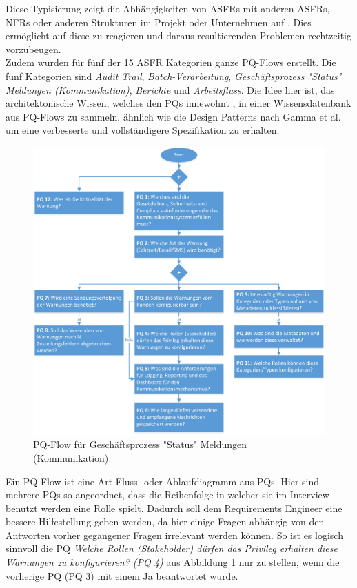 Diese Typisierung zeigt die Abh\"angigkeiten von ASFRs mit anderen ASFRs, NFRs oder anderen Strukturen im Projekt oder Unternehmen auf \cite{Ros02}. Dies erm\"oglicht auf diese zu reagieren und daraus resultierenden Problemen rechtzeitig vorzubeugen. \\

Zudem wurden f\"ur f\"unf der 15 ASFR Kategorien ganze PQ-Flows erstellt. Die f\"unf Kategorien sind \textit{Audit Trail}, \textit{Batch-Verarbeitung}, \textit{Gesch\"aftsprozess "Status" Meldungen (Kommunikation)}, \textit{Berichte} und \textit{Arbeitsfluss}. Die Idee hier ist, das architektonische Wissen, welches den PQs innewohnt \cite{Ros02}, in einer Wissensdatenbank aus PQ-Flows zu sammeln, \"ahnlich wie die Design Patterns nach Gamma et al. \cite{Ros03} um eine verbesserte und vollst\"andigere Spezifikation zu erhalten. \\

\begin{figure}[h]
	\centering
	\includegraphics[scale=0.45]{pqflow_communication.jpg} 
	\caption{PQ-Flow f\"ur Gesch\"aftsprozess "Status" Meldungen (Kommunikation) \cite{Ros01}}\label{fig_pqflow_communication}
\end{figure}

Ein PQ-Flow ist eine Art Fluss- oder Ablaufdiagramm aus PQs. Hier sind mehrere PQs so angeordnet, dass die Reihenfolge in welcher sie im Interview benutzt werden eine Rolle spielt. Dadurch soll dem Requirements Engineer eine bessere Hilfestellung geben werden, da hier einige Fragen abh\"angig von den Antworten vorher gegangener Fragen irrelevant werden k\"onnen. So ist es logisch sinnvoll die PQ \textit{Welche Rollen (Stakeholder) d\"urfen das Privileg erhalten diese Warnungen zu konfigurieren? (PQ 4)} aus Abbildung \ref{fig_pqflow_communication} nur zu stellen, wenn die vorherige PQ (PQ 3) mit einem Ja beantwortet wurde. \\

